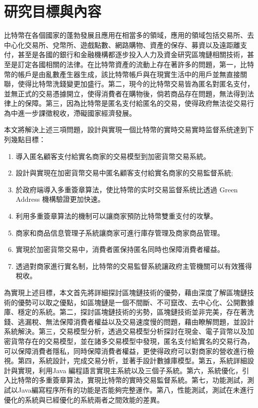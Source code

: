 		

	\section{研究目標與內容}
	比特幣在各個國家的蓬勃發展且應用在相當多的領域，應用的領域包括交易所、去中心化交易所、兌幣所、遊戲點數、網路購物、資產的保存、募資以及遠距離支付，甚至是各國的銀行和金融機構都逐步投入人力及資金研究區塊鏈相關技術，甚至是訂定各國相關的法律。在比特幣資產的流動上存在著許多的問題，第一，比特幣的帳戶是由亂數產生器生成，該比特幣帳戶與在現實生活中的用戶並無直接關聯，使得比特幣洗錢變更加盛行。第二，現今的比特幣交易皆為匿名對匿名支付，並無正式的交易憑據開立，使得消費者在購物後，倘若商品存在問題，無法得到法律上的保障。第三，因為比特幣是匿名支付給匿名的交易，使得政府無法從交易行為中進一步課徵稅收，滯礙國家經濟發展。

	本文將解決上述三項問題，設計與實現一個比特幣的實時交易實時监督系统達到下列幾點目標：

		\begin{enumerate}
			\item 導入匿名顧客支付給實名商家的交易模型到加密貨幣交易系統。
			\item 設計與實現在加密貨幣交易中匿名顧客支付給實名商家的交易監督系統;
			\item 於政府端導入多重簽章算法，使比特幣的实时交易监督系统比透過 Green Address 機構驗證更加快速。
			\item 利用多重簽章算法的機制可以讓商家預防比特幣雙重支付的攻擊。
			\item 商家和商品信息管理⼦系統讓商家可進行庫存管理及商家商品管理。
			\item 實現於加密貨幣交易中，消費者匿保持匿名同時也保障消費者權益。
			\item 透過對商家進行實名制，比特幣的交易監督系統讓政府主管機關可以有效獲得稅收。
		\end{enumerate}

	為實現上述目標，本文首先將詳細探討區塊鏈技術的優勢，藉由深度了解區塊鏈技術的優勢可以取之優點，如區塊鏈是一個不間斷、不可竄改、去中心化、公開數據庫、穩定的系統。第二，探討區塊鏈技術的劣勢，區塊鏈技術並非完美，存在著洗錢、逃漏稅、無法保障消費者權益以及交易速度慢的問題，藉由瞭解問題，並設計系統解決。第三，交易模型分析，透過交易模型分析探討在現金、電子貨幣以及加密貨幣存在的交易模型，並在諸多交易模型中發現，匿名支付給實名的交易行為，可以保障消費者隱私，同時保障消費者權益，更使得政府可以對商家的營收進行檢視。第四，系統設計，完成交易分析，並著⼿設計數據庫模型。第五，系統詳細設計與實現，利⽤Java 編程語⾔實現主系統以及三個⼦系統。第六，系統優化，引入比特幣的多重簽章算法，實現比特幣的實時交易監督系統。第七，功能測試，測試以Java編寫程序所有的功能是否能夠完整運作。第八，性能測試，測試在未進行優化的系統與已經優化的系統兩者之間效能的差異。


